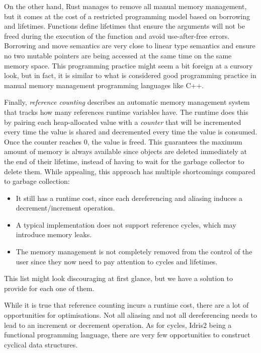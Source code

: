 \documentclass[
]{article}
\providecommand{\tightlist}{%
  \setlength{\itemsep}{0pt}\setlength{\parskip}{0pt}}
\begin{document}
On the other hand, Rust \cite{rust} manages to remove all manual memory
management, but it comes at the cost of a restricted programming model
based on borrowing and lifetimes. Functions define lifetimes that ensure
the arguments will not be freed during the execution of the function and
avoid use-after-free errors. Borrowing and move semantics are very close
to linear type semantics and ensure no two mutable pointers are being
accessed at the same time on the same memory space. This programming
practice might seem a bit foreign at a cursory look, but in fact, it is
similar to what is considered good programming practice in manual memory
management programming languages like C++.

Finally, \emph{reference counting} describes an automatic memory
management system that tracks how many references runtime variables
have. The runtime does this by pairing each heap-allocated value with a
\emph{counter} that will be incremented every time the value is shared
and decremented every time the value is consumed. Once the counter
reaches 0, the value is freed. This guarantees the maximum amount of
memory is always available since objects are deleted immediately at the
end of their lifetime, instead of having to wait for the garbage
collector to delete them. While appealing, this approach has multiple
shortcomings compared to garbage collection:

\begin{itemize}
\tightlist
\item
  It still has a runtime cost, since each dereferencing and aliasing
  induces a decrement/increment operation.
\item
  A typical implementation does not support reference cycles, which may
  introduce memory leaks.
\item
  The memory management is not completely removed from the control of
  the user since they now need to pay attention to cycles and lifetimes.
\end{itemize}

This list might look discouraging at first glance, but we have a
solution to provide for each one of them.

While it is true that reference counting incurs a runtime cost, there
are a lot of opportunities for optimisations. Not all aliasing and not
all dereferencing needs to lead to an increment or decrement operation.
As for cycles, Idris2 being a functional programming language, there are
very few opportunities to construct cyclical data structures.
\end{document}
